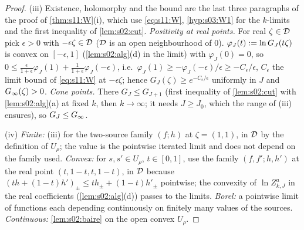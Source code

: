 \begin{proof}
(iii) Existence, holomorphy and the bound are the last three paragraphs of the proof of \cref{thm:s11:W}(i), which use \eqref{eq:s11:W}, \cref{hyp:s03:W1} for the $k$-limits and the first inequality of \cref{lem:s02:cut}. \emph{Positivity at real points.} For real $\zeta\in\mathcal D$ pick $\epsilon>0$ with $-\epsilon\zeta\in\mathcal D$ ($\mathcal D$ is an open neighbourhood of $0$). $\varphi_J(t):=\ln G_J(t\zeta)$ is convex on $[-\epsilon,1]$ (\cref{lem:s02:alg}(d) in the limit) with $\varphi_J(0)=0$, so $0\le\frac{\epsilon}{1+\epsilon}\varphi_J(1)+\frac1{1+\epsilon}\varphi_J(-\epsilon)$, i.e.\ $\varphi_J(1)\ge-\varphi_J(-\epsilon)/\epsilon\ge-C_\epsilon/\epsilon$, $C_\epsilon$ the limit bound of \eqref{eq:s11:W} at $-\epsilon\zeta$; hence $G_J(\zeta)\ge e^{-C_\epsilon/\epsilon}$ uniformly in $J$ and $G_\infty(\zeta)>0$. \emph{Cone points.} There $G_J\le G_{J+1}$ (first inequality of \cref{lem:s02:cut} with \cref{lem:s02:alg}(a) at fixed $k$, then $k\to\infty$; it needs $J\ge J_0$, which the range of (iii) ensures), so $G_J\le G_\infty$.

(iv) \emph{Finite:} (iii) for the two-source family $(f;h)$ at $\zeta=(1,1)$, in $\mathcal D$ by the definition of $U_\rho$; the value is the pointwise iterated limit and does not depend on the family used. \emph{Convex:} for $s,s'\in U_\rho$, $t\in[0,1]$, use the family $(f,f';h,h')$ at the real point $(t,1-t,t,1-t)$, in $\mathcal D$ because $(th+(1-t)h')_\pm\le th_\pm+(1-t)h'_\pm$ pointwise; the convexity of $\ln Z^a_{k,J}$ in the real coefficients (\cref{lem:s02:alg}(d)) passes to the limits. \emph{Borel:} a pointwise limit of functions each depending continuously on finitely many values of the sources. \emph{Continuous:} \cref{lem:s02:baire} on the open convex $U_\rho$.


\end{proof}
